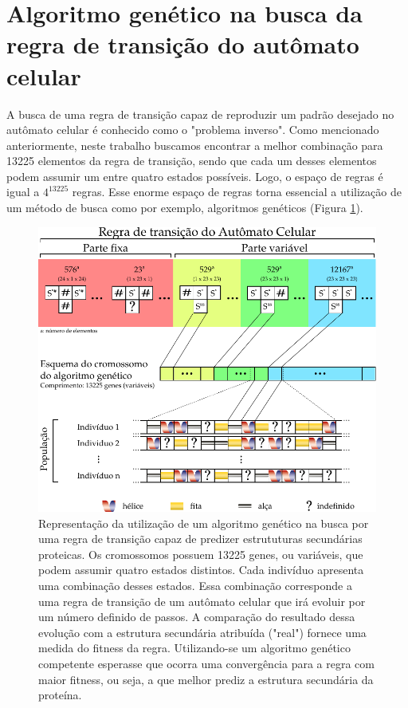 \documentclass[]{scrreprt}
\begin{document}
\section{Algoritmo genético na busca da regra de transição do autômato celular}

A busca de uma regra de transição capaz de reproduzir um padrão desejado no autômato celular é conhecido como o "problema inverso". Como mencionado anteriormente, neste trabalho buscamos encontrar a melhor combinação para 13225 elementos da regra de transição, sendo que cada um desses elementos podem assumir um entre quatro estados possíveis. Logo, o espaço de regras é igual a $4^{13225}$ regras. Esse enorme espaço de regras torna essencial a utilização de um método de busca como por exemplo, algoritmos genéticos (Figura \ref{ca_ga}).




\begin{figure}
	\label{ca_ga}
	\includegraphics{ca_ga_final}
	\caption{Representação da utilização de um algoritmo genético na busca por uma regra de transição capaz de predizer estrututuras secundárias proteicas. Os cromossomos possuem 13225 genes, ou variáveis, que podem assumir quatro estados distintos. Cada indivíduo apresenta uma combinação desses estados. Essa combinação corresponde a uma regra de transição de um autômato celular que irá evoluir por um número definido de passos. A comparação do resultado dessa evolução com a estrutura secundária atribuída ("real") fornece uma medida do fitness da regra. Utilizando-se um algoritmo genético competente esperasse que ocorra uma convergência para a regra com maior fitness, ou seja, a que melhor prediz a estrutura secundária da proteína.}
\end{figure}
\end{document}
